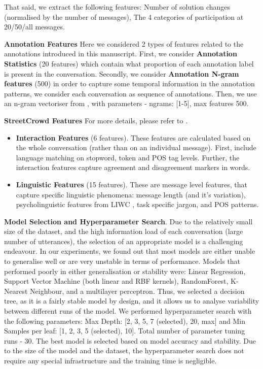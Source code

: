 \documentclass[acmsmall,manuscript,screen]{acmart}
\begin{document}
That said, we extract the following features: Number of solution changes (normalised by the number of messages), The 4 categories of participation at 20/50/all messages. 

\textbf{Annotation Features}
Here we considered 2 types of features related to the annotations introduced in this manuscript. First, we consider \textbf{Annotation Statistics} (20 features) which contain what proportion of each annotation label is present in the conversation. Secondly, we consider \textbf{Annotation N-gram features} (500) in order to capture some temporal information in the annotation patterns, we consider each conversation as sequence of annotations. Then, we use an n-gram vectoriser from \cite{scikit-learn}, with parameters - ngrams: [1-5], max features 500.

\textbf{StreetCrowd Features}
For more details, please refer to \cite{niculae2016conversational}.
\begin{itemize}
    \item \textbf{Interaction Features} (6 features). These features are calculated based on the whole conversation (rather than on an individual message). First, \cite{niculae2016conversational} include language matching on stopword, token and POS tag levels. Further, the interaction features capture agreement and disagreement markers in words. 
    
    \item \textbf{Linguistic Features} (15 features). These are message level features, that capture specific linguistic phenomena: message length (and it's variation), psycholinguistic features from LIWC \cite{Tausczik2010ThePM}, task specific jargon, and POS patterns.
\end{itemize}


\par
\textbf{Model Selection and Hyperparameter Search}.
Due to the relatively small size of the dataset, and the high information load of each conversation (large number of utterances), the selection of an appropriate model is a challenging endeavour. In our experiments, we found out that most models are either unable to generalise well or are very unstable in terms of performance. Models that performed poorly in either generalisation or stability were: Linear Regression, Support Vector Machine (both linear and RBF kernels), RandomForest, K-Nearest Neighbour, and a multilayer perceptron. Thus, we selected a decision tree, as it is a fairly stable model by design, and it allows us to analyse variability between different runs of the model. We performed hyperparameter search with the following parameters: Max Depth: [2, 3, 5, 7 (selected), 20, max] and Min Samples per leaf: [1, 2, 3, 5 (selected), 10]. Total number of parameter tuning runs - 30. The best model is selected based on model accuracy and stability. Due to the size of the model and the dataset, the hyperparameter search does not require any special infrastructure and the training time is negligible. 
\end{document}
